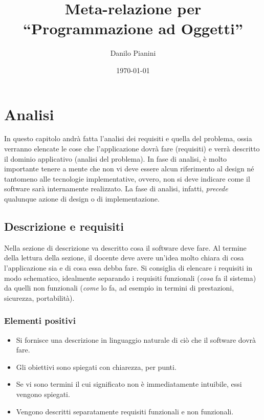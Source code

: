 \documentclass[a4paper,12pt]{report}
\title{Meta-relazione per\\``Programmazione ad Oggetti''}
\author{Danilo Pianini}
\date{\today}
\begin{document}
\maketitle

\tableofcontents

\chapter{Analisi}

In questo capitolo andrà fatta l'analisi dei requisiti e quella del problema, ossia verranno elencate le cose che
l'applicazione dovrà fare (requisiti) e verrà descritto il dominio applicativo (analisi del problema).
%
In fase di analisi, è molto importante tenere a mente che non vi deve essere alcun riferimento al design né tantomeno
alle tecnologie implementative, ovvero, non si deve indicare come il software sarà internamente realizzato.
%
La fase di analisi, infatti, \textit{precede} qualunque azione di design o di implementazione.

\section{Descrizione e requisiti}

Nella sezione di descrizione va descritto cosa il software deve fare.
%
Al termine della lettura della sezione,
il docente deve avere un'idea molto chiara di cosa l'applicazione sia
e di cosa essa debba fare.
%
Si consiglia di elencare i requisiti in modo schematico, idealmente separando i requisiti funzionali
(\emph{cosa} fa il sistema)
da quelli non funzionali
(\emph{come} lo fa, ad esempio in termini di prestazioni, sicurezza, portabilità).

\subsection*{Elementi positivi}
\begin{itemize}
	\item Si fornisce una descrizione in linguaggio naturale di ciò che il software dovrà fare.
	\item Gli obiettivi sono spiegati con chiarezza, per punti.
	\item Se vi sono termini il cui significato non è immediatamente intuibile, essi vengono spiegati.
	\item Vengono descritti separatamente requisiti funzionali e non funzionali.
\end{itemize}
\end{document}
